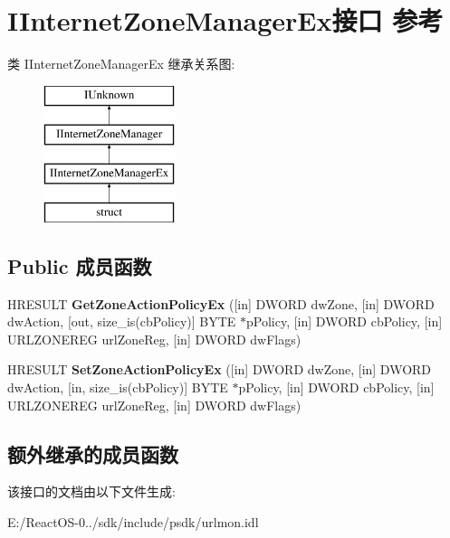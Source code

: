 \hypertarget{interface_i_internet_zone_manager_ex}{}\section{I\+Internet\+Zone\+Manager\+Ex接口 参考}
\label{interface_i_internet_zone_manager_ex}
类 I\+Internet\+Zone\+Manager\+Ex 继承关系图\+:\begin{figure}[H]
\begin{center}
\leavevmode
\includegraphics[height=4.000000cm]{interface_i_internet_zone_manager_ex}
\end{center}
\end{figure}
\subsection*{Public 成员函数}
\begin{DoxyCompactItemize}
\item 
\mbox{\label{interface_i_internet_zone_manager_ex_a4c73a52ce1db2950dbed7d7221bddbaf}} 
H\+R\+E\+S\+U\+LT {\bfseries Get\+Zone\+Action\+Policy\+Ex} (\mbox{[}in\mbox{]} D\+W\+O\+RD dw\+Zone, \mbox{[}in\mbox{]} D\+W\+O\+RD dw\+Action, \mbox{[}out, size\+\_\+is(cb\+Policy)\mbox{]} B\+Y\+TE $\ast$p\+Policy, \mbox{[}in\mbox{]} D\+W\+O\+RD cb\+Policy, \mbox{[}in\mbox{]} U\+R\+L\+Z\+O\+N\+E\+R\+EG url\+Zone\+Reg, \mbox{[}in\mbox{]} D\+W\+O\+RD dw\+Flags)
\item 
\mbox{\label{interface_i_internet_zone_manager_ex_a584de7cc3b2766a40cab60ddb30a8ae8}} 
H\+R\+E\+S\+U\+LT {\bfseries Set\+Zone\+Action\+Policy\+Ex} (\mbox{[}in\mbox{]} D\+W\+O\+RD dw\+Zone, \mbox{[}in\mbox{]} D\+W\+O\+RD dw\+Action, \mbox{[}in, size\+\_\+is(cb\+Policy)\mbox{]} B\+Y\+TE $\ast$p\+Policy, \mbox{[}in\mbox{]} D\+W\+O\+RD cb\+Policy, \mbox{[}in\mbox{]} U\+R\+L\+Z\+O\+N\+E\+R\+EG url\+Zone\+Reg, \mbox{[}in\mbox{]} D\+W\+O\+RD dw\+Flags)
\end{DoxyCompactItemize}
\subsection*{额外继承的成员函数}


该接口的文档由以下文件生成\+:\begin{DoxyCompactItemize}
\item 
E\+:/\+React\+O\+S-\/0../sdk/include/psdk/urlmon.\+idl\end{DoxyCompactItemize}
